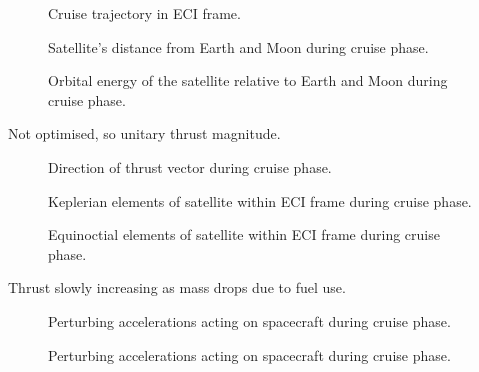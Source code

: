 \begin{figure}
\centering
\def\svgwidth{\figurewidth}

\caption{Cruise trajectory in ECI frame.}
\label{fig:Cruise-3D}
\end{figure}

\begin{figure}
\centering
\def\svgwidth{\figurewidth}

\caption{Satellite's distance from Earth and Moon during cruise phase.}
\label{fig:Cruise-dist}
\end{figure}

\begin{figure}
\centering
\def\svgwidth{\figurewidth}

\caption{Orbital energy of the satellite relative to Earth and Moon during cruise phase.}
\label{fig:Cruise-orbeng}
\end{figure}

Not optimised, so unitary thrust magnitude.

\begin{figure}
\centering
\def\svgwidth{\figurewidth}

\caption{Direction of thrust vector during cruise phase.}
\label{fig:Cruise-thrust}
\end{figure}

\begin{figure}
\centering
\def\svgwidth{\figurewidth}

\caption{Keplerian elements of satellite within ECI frame during cruise phase.}
\label{fig:Cruise-kep}
\end{figure}

\begin{figure}
\centering
\def\svgwidth{\figurewidth}

\caption{Equinoctial elements of satellite within ECI frame during cruise phase.}
\label{fig:Cruise-mee}
\end{figure}


Thrust slowly increasing as mass drops due to fuel use.

\begin{figure}
\centering
\def\svgwidth{\figurewidth}

\caption{Perturbing accelerations acting on spacecraft during cruise phase.}
\label{fig:Cruise-pert}
\end{figure}

\begin{figure}
\centering
\def\svgwidth{\figurewidth}

\caption{Perturbing accelerations acting on spacecraft during cruise phase.}
\label{fig:Cruise-pert2}
\end{figure}

